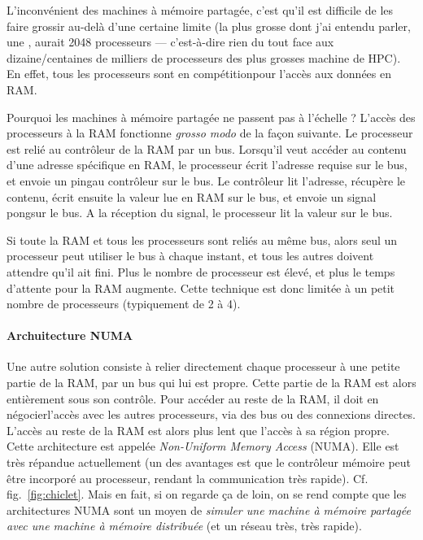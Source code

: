 L'inconvénient des machines à mémoire partagée, c'est qu'il est difficile de les
faire grossir au-delà d'une certaine limite (la plus grosse dont j'ai entendu
parler, une , aurait 2048 processeurs ---
c'est-à-dire rien du tout face aux dizaine/centaines de milliers de processeurs
des plus grosses machine de HPC). En effet, tous les processeurs sont \og en
compétition\fg pour l'accès aux données en RAM.

\begin{danger}
  Pourquoi les machines à mémoire partagée ne passent pas à l'échelle ? L'accès
  des processeurs à la RAM fonctionne \textit{grosso modo} de la façon
  suivante. Le processeur est relié au contrôleur de la RAM par un
  bus. Lorsqu'il veut accéder au contenu d'une adresse spécifique en RAM, le
  processeur écrit l'adresse requise sur le bus, et envoie un \og ping\fg au
  contrôleur sur le bus. Le contrôleur lit l'adresse, récupère le contenu, écrit
  ensuite la valeur lue en RAM sur le bus, et envoie un signal \og pong\fg sur
  le bus. A la réception du signal, le processeur lit la valeur sur le bus.

  Si toute la RAM et tous les processeurs sont reliés au même bus, alors seul un
  processeur peut utiliser le bus à chaque instant, et tous les autres doivent
  attendre qu'il ait fini. Plus le nombre de processeur est élevé, et plus le
  temps d'attente pour la RAM augmente. Cette technique est donc limitée à un
  petit nombre de processeurs (typiquement de 2 à 4).
\end{danger}


\paragraph{Archuitecture NUMA} Une autre solution consiste à relier directement
chaque processeur à une petite partie de la RAM, par un bus qui lui est
propre. Cette partie de la RAM est alors entièrement sous son contrôle. Pour
accéder au reste de la RAM, il doit en \og négocier\fg l'accès avec les autres
processeurs, via des bus ou des connexions directes. L'accès au reste de la RAM
est alors plus lent que l'accès à sa \og région propre\fg. Cette architecture
est appelée \og \textit{Non-Uniform Memory Access} (NUMA)\fg. Elle est très
répandue actuellement (un des avantages est que le contrôleur mémoire peut être
incorporé au processeur, rendant la communication très
rapide). Cf. fig.~\ref{fig:chiclet}. Mais en fait, si on regarde ça de loin, on
se rend compte que les architectures NUMA sont un moyen de \emph{simuler une
  machine à mémoire partagée avec une machine à mémoire distribuée} (et un
réseau très, très rapide).

